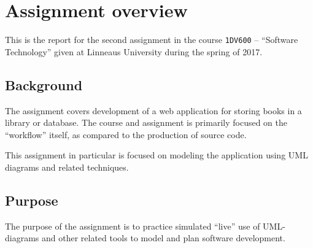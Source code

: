 %
%
%
%


\section{Assignment overview}
This is the report for the second assignment in the course \texttt{1DV600} --
``Software Technology'' given at Linneaus University during the spring of 2017.


\subsection{Background}
The assignment covers development of a web application for storing books in a
library or database. The course and assignment is primarily focused on the
``workflow'' itself, as compared to the production of source code.

This assignment in particular is focused on modeling the application using
UML diagrams and related techniques.


\subsection{Purpose}
The purpose of the assignment is to practice simulated ``live'' use of
UML-diagrams and other related tools to model and plan software development.

